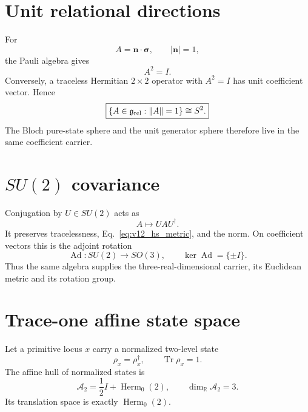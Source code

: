 \documentclass[11pt,a4paper,twoside]{book}
\theoremstyle{definition}
\begin{document}
\section{Unit relational directions}

For
\begin{equation}
A=\mathbf n\cdot\boldsymbol\sigma,
\qquad
|\mathbf n|=1,
\end{equation}
the Pauli algebra gives
\begin{equation}
A^2=I.
\end{equation}
Conversely, a traceless Hermitian $2\times2$ operator with $A^2=I$ has unit coefficient vector. Hence
\begin{equation}
\boxed{
\{A\in\mathfrak g_{\rm rel}:\|A\|=1\}
\cong S^2.
}
\label{eq:v12_generator_sphere}
\end{equation}
The Bloch pure-state sphere and the unit generator sphere therefore live in the same coefficient carrier.

\section[SU(2) covariance]{$SU(2)$ covariance}

Conjugation by $U\in SU(2)$ acts as
\begin{equation}
A\mapsto UAU^\dagger.
\end{equation}
It preserves tracelessness, Eq.~\eqref{eq:v12_hs_metric}, and the norm. On coefficient vectors this is the adjoint rotation
\begin{equation}
\boxed{
\operatorname{Ad}:SU(2)\to SO(3),
\qquad
\ker\operatorname{Ad}=\{\pm I\}.
}
\end{equation}
Thus the same algebra supplies the three-real-dimensional carrier, its Euclidean metric and its rotation group.

\section{Trace-one affine state space}

Let a primitive locus $x$ carry a normalized two-level state
\begin{equation}
\rho_x=\rho_x^\dagger,
\qquad
\operatorname{Tr}\rho_x=1.
\end{equation}
The affine hull of normalized states is
\begin{equation}
\boxed{
\mathcal A_2
=\frac12I+\operatorname{Herm}_0(2),
\qquad
\dim_{\mathbb R}\mathcal A_2=3.
}
\label{eq:v12_affine_state_space}
\end{equation}
Its translation space is exactly $\operatorname{Herm}_0(2)$.
\end{document}
